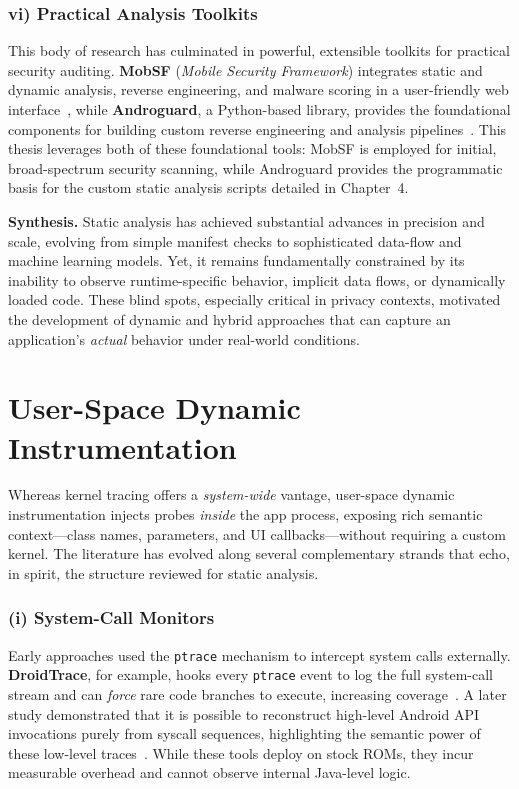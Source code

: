 \documentclass[a4paper,12pt]{report}
\begin{document}
\subsubsection{vi) Practical Analysis Toolkits}
This body of research has culminated in powerful, extensible toolkits for practical security auditing. \textbf{MobSF} (\emph{Mobile Security Framework}) integrates static and dynamic analysis, reverse engineering, and malware scoring in a user-friendly web interface~\cite{mobsf2023}, while \textbf{Androguard}, a Python-based library, provides the foundational components for building custom reverse engineering and analysis pipelines~\cite{androguard2023}. This thesis leverages both of these foundational tools: MobSF is employed for initial, broad-spectrum security scanning, while Androguard provides the programmatic basis for the custom static analysis scripts detailed in Chapter~4.

\medskip
\noindent\textbf{Synthesis.}
Static analysis has achieved substantial advances in precision and scale, evolving from simple manifest checks to sophisticated data-flow and machine learning models. Yet, it remains fundamentally constrained by its inability to observe runtime-specific behavior, implicit data flows, or dynamically loaded code. These blind spots, especially critical in privacy contexts, motivated the development of dynamic and hybrid approaches that can capture an application's \emph{actual} behavior under real-world conditions.


\section{User-Space Dynamic Instrumentation}
\label{sec:rw:dynamic:user}

Whereas kernel tracing offers a \emph{system-wide} vantage, user-space dynamic instrumentation injects probes \emph{inside} the app process, exposing rich semantic context—class names, parameters, and UI callbacks—without requiring a custom kernel. The literature has evolved along several complementary strands that echo, in spirit, the structure reviewed for static analysis.

\subsubsection*{(i) System-Call Monitors}
Early approaches used the \texttt{ptrace} mechanism to intercept system calls externally. \textbf{DroidTrace}, for example, hooks every \texttt{ptrace} event to log the full system-call stream and can \emph{force} rare code branches to execute, increasing coverage~\cite{zheng2014droidtrace}. A later study demonstrated that it is possible to reconstruct high-level Android API invocations purely from syscall sequences, highlighting the semantic power of these low-level traces~\cite{nisi2019syscall}. While these tools deploy on stock ROMs, they incur measurable overhead and cannot observe internal Java-level logic.
\end{document}
